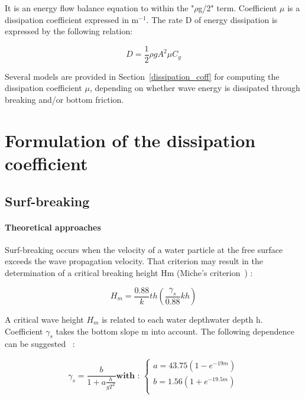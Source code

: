 It is an energy flow balance equation to within the "$\rho$g/2" term.
Coefficient $\mu$ is a dissipation coefficient expressed in m${}^{-1}$. The
rate D of energy dissipation is expressed by the following relation:

\begin{equation}
  D = \frac{1}{2}\rho g A^{2} \mu C_{g}
  \label{eq:3.36}
\end{equation}

Several models are provided in Section~\ref{dissipation_coff} for computing the
dissipation coefficient $\mu$, depending on whether wave energy is dissipated
through breaking and/or bottom friction.


\section{Formulation of the dissipation coefficient}\label{dissipation_coeff}


\subsection{Surf-breaking }


\paragraph{Theoretical approaches }

Surf-breaking occurs when the velocity of a water particle at the free surface
exceeds the wave propagation velocity. That criterion may result in the
determination of a critical breaking height Hm  (Miche's criterion~\cite{Mei1983}) :

\begin{equation}
  H_{m} = \frac{0.88}{k}th\left(\frac{\gamma_{s}}{0.88}kh\right)
  \label{eq:3.37}
\end{equation}

A critical wave height $H_{m}$ is related to each water depthwater
depth h. Coefficient $\gamma_{s}$ takes the bottom slope m into account.
The following dependence can be suggested~\cite{Hamm1995} :

\begin{equation}
  \gamma_{s} = \frac{b}{1+a\frac{h}{gT^{2}}}
\textbf{with :   }
  \left\{\begin{matrix}
    a = 43.75(1-e^{-19m}) \\
    b = 1.56(1+e^{-19.5m}) \\
  \end{matrix}\right.
  \label{eq:3.38}
\end{equation}

